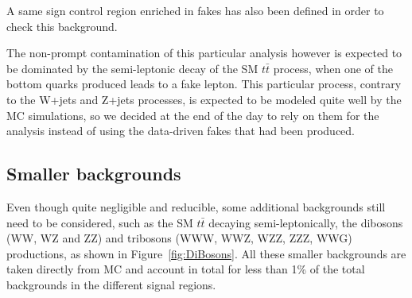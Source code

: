 \documentclass[a4paper, 10pt, openright]{report}
\begin{document}
A same sign control region enriched in fakes has also been defined in order to check this background.

The non-prompt contamination of this particular analysis however is expected to be dominated by the semi-leptonic decay of the \ac{SM} $t \bar t$ process, when one of the bottom quarks produced leads to a fake lepton. This particular process, contrary to the W+jets and Z+jets processes, is expected to be modeled quite well by the \ac{MC} simulations, so we decided at the end of the day to rely on them for the analysis instead of using the data-driven fakes that had been produced.  %

%
%

\subsection{Smaller backgrounds} \label{subsection:SmallerBkg}

Even though quite negligible and reducible, some additional backgrounds still need to be considered, such as the \ac{SM} $t \bar t$ decaying semi-leptonically, the dibosons (WW, WZ and ZZ) and tribosons (WWW, WWZ, WZZ, ZZZ, WWG) productions, as shown in Figure~\ref{fig:DiBosons}. All these smaller backgrounds are taken directly from \ac{MC} and account in total for less than 1\% of the total backgrounds in the different signal regions. 
\end{document}
